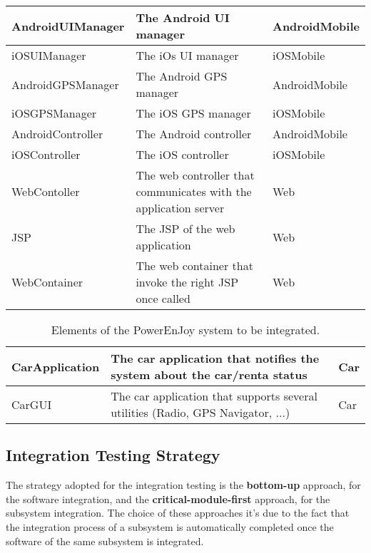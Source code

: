 \begin{table} [H]
\begin{small}
\begin{tabular}{| p{} | p{} | p{} |}
    \hline
    AndroidUIManager & The Android UI manager & AndroidMobile\\
    \hline
    iOSUIManager & The iOs UI manager & iOSMobile\\
    \hline
    AndroidGPSManager & The Android GPS manager & AndroidMobile\\
    \hline
    iOSGPSManager & The iOS GPS manager & iOSMobile\\
    \hline
    AndroidController & The Android controller & AndroidMobile\\
    \hline
    iOSController & The iOS controller & iOSMobile\\
    \hline
    WebContoller & The web controller that communicates with the application server & Web\\
    \hline
    JSP & The JSP of the web application & Web\\
    \hline
    WebContainer & The web container that invoke the right JSP once called & Web\\
    \hline
    \end{tabular}
    \end{small}
    \label{table subsystem 1}
\end{table}


\begin{table} [H]
    \centering
    \begin{small}
    \begin{tabular}{| p{} | p{} | p{} |}
    \hline
    CarApplication & The car application that notifies the system about the car/renta status & Car\\
    \hline
    CarGUI & The car application that supports several utilities (Radio, GPS Navigator, ...) & Car\\
    \hline
    \end{tabular}
    \end{small}
    \caption{Elements of the PowerEnJoy system to be integrated.}
    \label{table subsystem 2}
\end{table}
  
\subsection{Integration Testing Strategy} \label{sec integration test strategy}

The strategy adopted for the integration testing is the \textbf{bottom-up} approach, for the software integration, and the \textbf{critical-module-first} approach, for the subsystem integration. The choice of these approaches it's due to the fact that the integration process of a subsystem is automatically completed once the software of the same subsystem is integrated.


